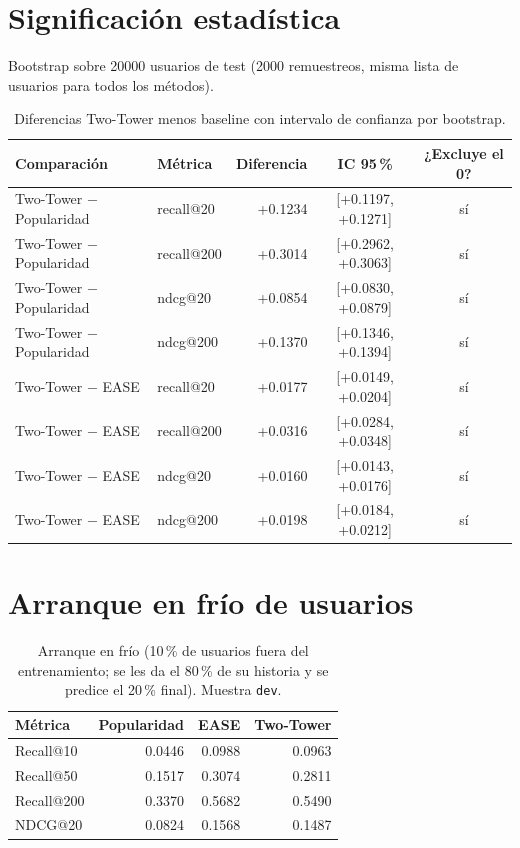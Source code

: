 \section{Significación estadística}
Bootstrap sobre 20000 usuarios de test (2000 remuestreos, misma lista de usuarios para todos los métodos).
\begin{table}[H]\centering\small
\begin{tabular}{llrcc}\toprule
Comparación & Métrica & Diferencia & IC 95\,\% & ¿Excluye el 0? \\\midrule
Two-Tower $-$ Popularidad & recall@20 & +0.1234 & [+0.1197, +0.1271] & sí \\
Two-Tower $-$ Popularidad & recall@200 & +0.3014 & [+0.2962, +0.3063] & sí \\
Two-Tower $-$ Popularidad & ndcg@20 & +0.0854 & [+0.0830, +0.0879] & sí \\
Two-Tower $-$ Popularidad & ndcg@200 & +0.1370 & [+0.1346, +0.1394] & sí \\
Two-Tower $-$ EASE & recall@20 & +0.0177 & [+0.0149, +0.0204] & sí \\
Two-Tower $-$ EASE & recall@200 & +0.0316 & [+0.0284, +0.0348] & sí \\
Two-Tower $-$ EASE & ndcg@20 & +0.0160 & [+0.0143, +0.0176] & sí \\
Two-Tower $-$ EASE & ndcg@200 & +0.0198 & [+0.0184, +0.0212] & sí \\
\bottomrule\end{tabular}
\caption{Diferencias Two-Tower menos baseline con intervalo de confianza por bootstrap.}\end{table}

\section{Arranque en frío de usuarios}
\begin{table}[H]\centering\small
\begin{tabular}{lrrr}\toprule
Métrica & Popularidad & EASE & Two-Tower \\\midrule
Recall@10 & 0.0446 & 0.0988 & 0.0963 \\
Recall@50 & 0.1517 & 0.3074 & 0.2811 \\
Recall@200 & 0.3370 & 0.5682 & 0.5490 \\
NDCG@20 & 0.0824 & 0.1568 & 0.1487 \\
\bottomrule\end{tabular}
\caption{Arranque en frío (10\,\% de usuarios fuera del entrenamiento; se les da el 80\,\% de su historia y se predice el 20\,\% final). Muestra \texttt{dev}.}\end{table}

